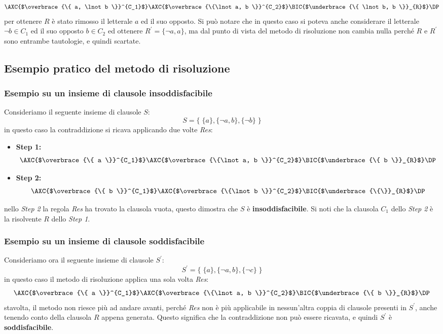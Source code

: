 \documentclass[a4paper,12pt]{report}
\begin{document}
\[
    \AXC{$\overbrace{\{ a, \lnot b \}}^{C_1}$}
    \AXC{$\overbrace{\{\lnot a, b \}}^{C_2}$}
    \RightLabel{Res}
    \BIC{$\underbrace{\{ \lnot b, b \}}_{R}$}
    \DP
\]
per ottenere $R$ è stato rimosso il letterale $a$ ed il suo opposto. Si può notare che in questo caso si poteva anche considerare il letterale $\lnot b \in C_1$ ed il suo opposto $b \in C_2$ ed ottenere $R^{'} = \{ \lnot a, a \}$, ma dal punto di vista del metodo di risoluzione non cambia nulla perché $R$ e $R^{'}$ sono entrambe tautologie, e quindi scartate.

\subsection{Esempio pratico del metodo di risoluzione}
\subsubsection{Esempio su un insieme di clausole insoddisfacibile}
\label{resolution_example}
Consideriamo il seguente insieme di clausole $S$:
\[ S = \{ \; \{a\}, \{\lnot a, b\}, \{\lnot b\} \; \} \]
in questo caso la contraddizione si ricava applicando due volte \emph{Res}:

\begin{itemize}
    \item \textbf{Step 1:}
    \[
    \AXC{$\overbrace{\{ a \}}^{C_1}$}
    \AXC{$\overbrace{\{\lnot a, b \}}^{C_2}$}
    \RightLabel{Res}
    \BIC{$\underbrace{\{ b \}}_{R}$}
    \DP
    \]
    \item \textbf{Step 2:}
    \[
    \AXC{$\overbrace{\{ b \}}^{C_1}$}
    \AXC{$\overbrace{\{\lnot b \}}^{C_2}$}
    \RightLabel{Res}
    \BIC{$\underbrace{\{\}}_{R}$}
    \DP
    \]
\end{itemize}
nello \emph{Step 2} la regola \emph{Res} ha trovato la clausola vuota, questo dimostra che $S$ è \textbf{insoddisfacibile}. Si noti che la clausola $C_1$ dello \emph{Step 2} è la risolvente $R$ dello \emph{Step 1}.

\subsubsection{Esempio su un insieme di clausole soddisfacibile}
Consideriamo ora il seguente insieme di clausole $S^{'}$:
\[ S^{'} = \{ \; \{a\}, \{\lnot a, b\}, \{\lnot c\} \; \} \]
in questo caso il metodo di risoluzione applica una sola volta \emph{Res}:
\[
    \AXC{$\overbrace{\{ a \}}^{C_1}$}
    \AXC{$\overbrace{\{\lnot a, b \}}^{C_2}$}
    \RightLabel{Res}
    \BIC{$\underbrace{\{ b \}}_{R}$}
    \DP
\]
stavolta, il metodo non riesce più ad andare avanti, perché \emph{Res} non è più applicabile in nessun'altra coppia di clausole presenti in $S^{'}$, anche tenendo conto della clausola $R$ appena generata. Questo significa che la contraddizione non può essere ricavata, e quindi $S^{'}$ è \textbf{soddisfacibile}.
\end{document}
